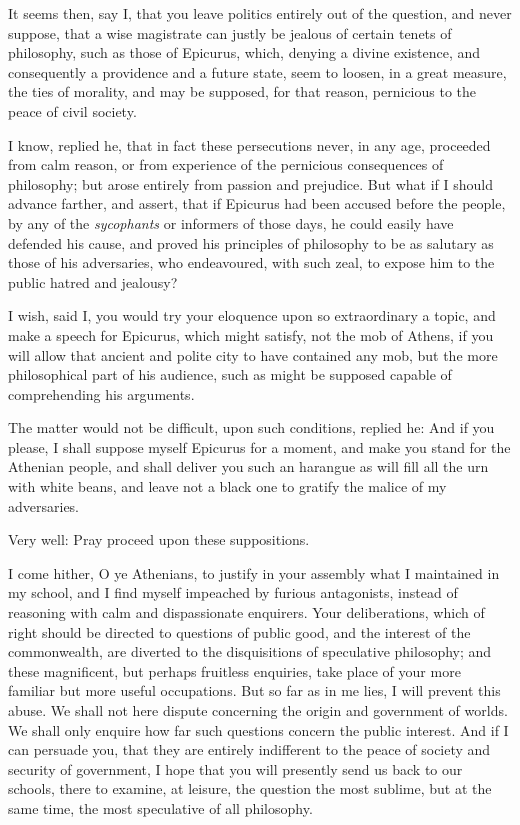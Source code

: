 \documentclass[]{article}
\begin{document}
\begin{sectionbody}
\humeparagraph  It seems then, say I, that you leave politics entirely out of the question, and never suppose, that a wise magistrate can justly be jealous of certain tenets of philosophy, such as those of Epicurus, which, denying a divine existence, and consequently a providence and a future state, seem to loosen, in a great measure, the ties of morality, and may be supposed, for that reason, pernicious to the peace of civil society.

\humeparagraph  I know, replied he, that in fact these persecutions never, in any age, proceeded from calm reason, or from experience of the pernicious consequences of philosophy; but arose entirely from passion and prejudice. But what if I should advance farther, and assert, that if Epicurus had been accused before the people, by any of the \emph{sycophants} or informers of those days, he could easily have defended his cause, and proved his principles of philosophy to be as salutary as those of his adversaries, who endeavoured, with such zeal, to expose him to the public hatred and jealousy?

\humeparagraph  I wish, said I, you would try your eloquence upon so extraordinary a topic, and make a speech for Epicurus, which might satisfy, not the mob of Athens, if you will allow that ancient and polite city to have contained any mob, but the more philosophical part of his audience, such as might be supposed capable of comprehending his arguments.

\humeparagraph  The matter would not be difficult, upon such conditions, replied he: And if you please, I shall suppose myself Epicurus for a moment, and make you stand for the Athenian people, and shall deliver you such an harangue as will fill all the urn with white beans, and leave not a black one to gratify the malice of my adversaries.

\humeparagraph  Very well: Pray proceed upon these suppositions.

\humeparagraph  I come hither, O ye Athenians, to justify in your assembly what I maintained in my school, and I find myself impeached by furious antagonists, instead of reasoning with calm and dispassionate enquirers. Your deliberations, which of right should be directed to questions of public good, and the interest of the commonwealth, are diverted to the disquisitions of speculative philosophy; and these magnificent, but perhaps fruitless enquiries, take place of your more familiar but more useful occupations. But so far as in me lies, I will prevent this abuse. We shall not here dispute concerning the origin and government of worlds. We shall only enquire how far such questions concern the public interest. And if I can persuade you, that they are entirely indifferent to the peace of society and security of government, I hope that you will presently send us back to our schools, there to examine, at leisure, the question the most sublime, but at the same time, the most speculative of all philosophy.


\end{sectionbody}
\end{document}
